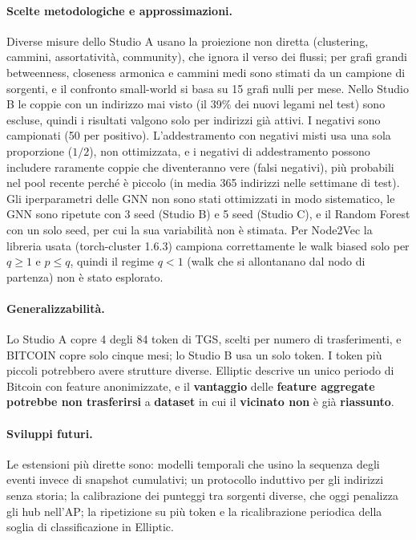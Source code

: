 \documentclass[11pt]{article}
\begin{document}
\paragraph{Scelte metodologiche e approssimazioni.}
Diverse misure dello Studio A usano la proiezione non diretta (clustering,
cammini, assortatività, community), che ignora il verso dei flussi; per
grafi grandi betweenness, closeness armonica e cammini medi sono stimati da
un campione di sorgenti, e il confronto small-world si basa su 15 grafi
nulli per mese. Nello Studio B le coppie con un indirizzo mai visto (il 39\%
dei nuovi legami nel test) sono escluse, quindi i risultati valgono solo per
indirizzi già attivi. I negativi sono campionati (50 per positivo).
L'addestramento con negativi misti usa una sola proporzione ($1/2$), non
ottimizzata, e i negativi di addestramento possono includere raramente
coppie che diventeranno vere (falsi negativi), più probabili nel pool
recente perché è piccolo (in media 365 indirizzi nelle settimane di test). Gli iperparametri delle GNN non
sono stati ottimizzati in modo sistematico, le GNN sono ripetute con 3 seed
(Studio B) e 5 seed (Studio C), e il Random Forest con un solo seed, per cui
la sua variabilità non è stimata. Per Node2Vec la libreria usata
(torch-cluster 1.6.3) campiona correttamente le walk biased solo per
$q \ge 1$ e $p \le q$, quindi il regime $q < 1$ (walk che si allontanano
dal nodo di partenza) non è stato esplorato.

\paragraph{Generalizzabilità.}
Lo Studio A copre 4 degli 84 token di TGS, scelti per numero di
trasferimenti, e BITCOIN copre solo cinque mesi; lo Studio B usa un solo
token. I token più piccoli potrebbero avere strutture diverse. Elliptic
descrive un unico periodo di Bitcoin con feature anonimizzate, e il
\textbf{vantaggio} delle\textbf{ feature aggregate potrebbe non trasferirsi }a \textbf{dataset} in cui
il \textbf{vicinato non} è già \textbf{riassunto}.


\paragraph{Sviluppi futuri.}
Le estensioni più dirette sono: modelli temporali che usino la sequenza
degli eventi invece di snapshot cumulativi; un protocollo induttivo per gli indirizzi
senza storia; la calibrazione dei punteggi tra sorgenti diverse, che oggi
penalizza gli hub nell'AP; la ripetizione su più token e la ricalibrazione
periodica della soglia di classificazione in Elliptic.
\end{document}
